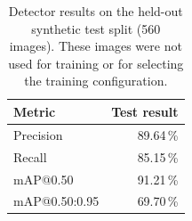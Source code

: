 \begin{table}[htbp]
\centering
\caption{Detector results on the held-out synthetic test split (560 images). These images were not used for training or for selecting the training configuration.}
\label{tab:test-split-results}
\begin{tabular}{|l|r|}
\hline
\textbf{Metric} & \textbf{Test result} \\
\hline
Precision & 89.64\,\% \\
\hline
Recall & 85.15\,\% \\
\hline
mAP@0.50 & 91.21\,\% \\
\hline
mAP@0.50:0.95 & 69.70\,\% \\
\hline
\end{tabular}
\end{table}
